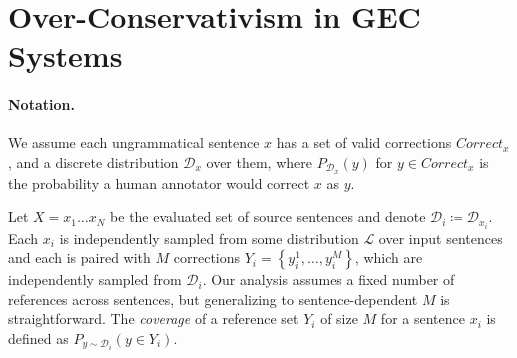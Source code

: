 \documentclass[letterpaper, 11pt]{article}
\begin{document}
%
%
%
%

\section{Over-Conservativism in GEC Systems}\label{sec:formal_conservatism}
%
%

\paragraph{Notation.}
We assume each ungrammatical sentence $x$ has a set of valid corrections $Correct_x$,
and a discrete distribution $\mathcal{D}_x$ over them, where $P_{\mathcal{D}_x}(y)$
for $y \in Correct_x$ is the probability a human annotator would correct $x$ as $y$.

Let $X=x_{1}\ldots x_{N}$ be the evaluated set of source sentences and denote $\mathcal{D}_{i}\coloneqq \mathcal{D}_{x_i}$. Each $x_{i}$ is independently sampled from some 
distribution $\mathcal{L}$ over input sentences 
and each is paired with $M$ corrections $Y_i = \left\{y_{i}^{1},\ldots, y_{i}^{M}\right\}$,
which are independently sampled from $\mathcal{D}_{i}$. Our analysis assumes a fixed number of references across sentences, 
but generalizing to sentence-dependent $M$ is straightforward.
The {\it coverage} of a reference set $Y_i$ of size $M$ for a sentence $x_i$ is defined as $P_{y \sim \mathcal{D}_i}(y \in Y_i)$.
\end{document}
